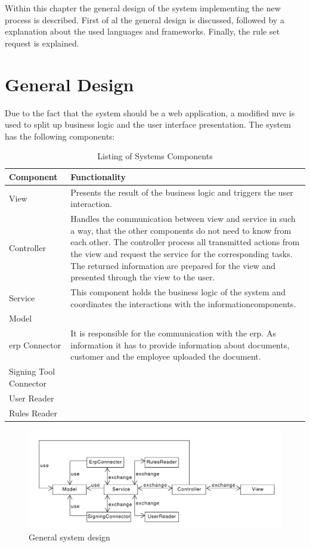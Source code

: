 Within this chapter the general design of the system implementing the new process is described. First of al the general design is discussed, followed by a explanation about the used languages and frameworks. Finally, the rule set request is explained. 

\section{General Design}
Due to the fact that the system should be a web application, a modified \gls{mvc} is used to split up business logic and the user interface presentation. The system has the following components:

\begin{table}[h!]
	\begin{tabular}{|p{4cm}|p{11cm}|} \hline
		Component & Functionality \\ \hline
		View & Presents the result of the  business logic and triggers the user interaction.\\ \hline
		Controller & Handles the communication between view and service in such a way, that the other components do not need to know from each other. The controller process all transmitted actions from the view and request the service for the corresponding tasks. The returned information are prepared for the view and presented through the view to the user. \\ \hline
		Service & This component holds the business logic of the system and coordinates the interactions with the \frqq information\flqq components. \\ \hline
		Model & \\ \hline
		\Gls{erp} Connector & It is responsible for the communication with the \gls{erp}. As information it has to provide information about documents, customer and the employee uploaded the document. \\ \hline
		Signing Tool Connector & \\ \hline
		User Reader & \\ \hline
		Rules Reader & \\ \hline
	\end{tabular}
	\centering
	\caption{Listing of Systems Components}
	\label{tab:listingSystemComponents}
\end{table}
\begin{figure}[h!]
	\includegraphics[width=\linewidth]{./design/images/generalCommunication.pdf}
	\caption{General system design}
	\label{fig:generalDesign}
\end{figure}

